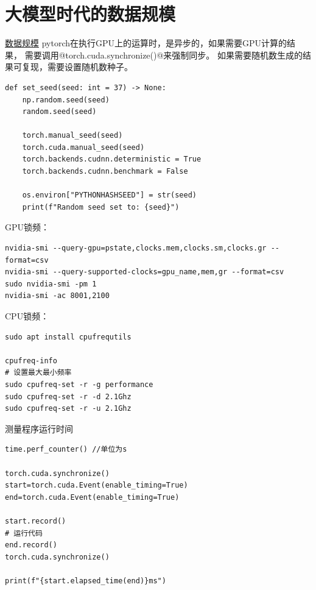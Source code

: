 \section{大模型时代的数据规模}
\href{https://epoch.ai/data/ai-models}{数据规模}
pytorch在执行GPU上的运算时，是异步的，如果需要GPU计算的结果，
需要调用@torch.cuda.synchronize()@来强制同步。
如果需要随机数生成的结果可复现，需要设置随机数种子。
\begin{code}
\begin{verbatim}
def set_seed(seed: int = 37) -> None:
    np.random.seed(seed)
    random.seed(seed)

    torch.manual_seed(seed)
    torch.cuda.manual_seed(seed)
    torch.backends.cudnn.deterministic = True
    torch.backends.cudnn.benchmark = False

    os.environ["PYTHONHASHSEED"] = str(seed)
    print(f"Random seed set to: {seed}")
\end{verbatim}
\end{code}

GPU锁频：
\begin{code}
\begin{verbatim}
nvidia-smi --query-gpu=pstate,clocks.mem,clocks.sm,clocks.gr --format=csv
nvidia-smi --query-supported-clocks=gpu_name,mem,gr --format=csv
sudo nvidia-smi -pm 1
nvidia-smi -ac 8001,2100
\end{verbatim}
\end{code}

CPU锁频：
\begin{code}
\begin{verbatim}
sudo apt install cpufrequtils

cpufreq-info
# 设置最大最小频率
sudo cpufreq-set -r -g performance
sudo cpufreq-set -r -d 2.1Ghz
sudo cpufreq-set -r -u 2.1Ghz
\end{verbatim}
\end{code}

测量程序运行时间
\begin{code}
\begin{verbatim}
time.perf_counter() //单位为s

torch.cuda.synchronize()
start=torch.cuda.Event(enable_timing=True)
end=torch.cuda.Event(enable_timing=True)

start.record()
# 运行代码
end.record()
torch.cuda.synchronize()

print(f"{start.elapsed_time(end)}ms")
\end{verbatim}
\end{code}
